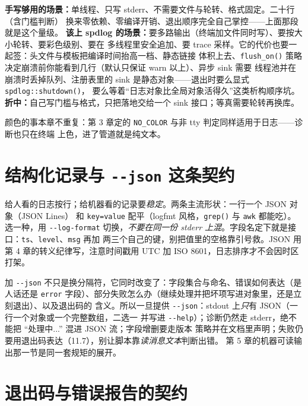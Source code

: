 \documentclass[12pt,a4paper,fontset=fandol]{ctexbook}
\newcommand{\Fn}[1]{\texttt{#1()}}
\newcommand{\Tp}[1]{\texttt{#1}}
\newcommand{\Opt}[1]{\texttt{-\/-#1}}
\begin{document}
\begin{compare}[title={手写二十行 与 引入 spdlog}]
\textbf{手写够用的场景：}单线程、只写 stderr、不需要文件与轮转、格式固定。二十行（含门槛判断）
换来零依赖、零编译开销、退出顺序完全自己掌控——上面那段就是这个量级。
\textbf{该上 spdlog 的场景：}要多路输出（终端加文件同时写）、要按大小轮转、要彩色级别、要在
多线程里安全追加、要 trace 采样。它的代价也要一起签：头文件与模板把编译时间抬高一档、静态链接
体积上去、\Fn{flush\_on} 策略决定崩溃前你能看到几行（默认只保证 warn 以上）、异步 sink 需要
线程池并在崩溃时丢掉队列、注册表里的 sink 是静态对象——退出时要么显式 \Fn{spdlog::shutdown}，
要么等着``日志对象比全局对象活得久''这类析构顺序坑。
\textbf{折中：}自己写门槛与格式，只把落地交给一个 sink 接口；等真需要轮转再换库。
\end{compare}

颜色的事本章不重复：第 3 章定的 \Tp{NO\_COLOR} 与非 tty 判定同样适用于日志——诊断也只在终端
上色，进了管道就是纯文本。

\section{结构化记录与 \Opt{json} 这条契约}

给人看的日志按行；给机器看的记录要\emph{稳定}。两条主流形状：一行一个 JSON 对象（JSON Lines）
和 \Tp{key=value} 配平（logfmt 风格，\Fn{grep} 与 \Tp{awk} 都能吃）。选一种，用 \Opt{log-format}
切换，\emph{不要在同一份 stderr 上混}。字段名定下就是接口：\Tp{ts}、\Tp{level}、\Tp{msg} 再加
两三个自己的键，别把值里的空格靠引号救。JSON 用第 4 章的转义纪律写，注意时间戳用 UTC 加
ISO 8601，日志排序才不会因时区打架。

\begin{warning}[title={json 开关改的是整份输出契约}]
加 \Opt{json} 不只是换分隔符，它同时改变了：字段集合与命名、错误如何表达（是人话还是
\Tp{error} 字段）、部分失败怎么办（继续处理并把坏项写进对象里，还是立刻退出）、以及退出码的
含义。所以一旦提供 \Opt{json}：stdout 上\emph{只}有 JSON（一行一个对象或一个完整数组，二选一
并写进 \Opt{help}）；诊断仍然走 stderr，绝不能把 ``处理中...'' 混进 JSON 流；字段增删要走版本
策略并在文档里声明；失败仍要用退出码表达（11.7），别让脚本靠\emph{读消息文本}判断出错。
第 5 章的机器可读输出那一节是同一套规矩的展开。
\end{warning}

\section{退出码与错误报告的契约}
\end{document}
